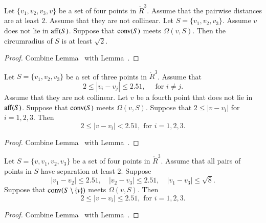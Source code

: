 \newpage
\begin{lemma}
Let $\{v_1,v_2,v_3,v\}$ be a set of four points in $\ring{R}^3$. Assume that the pairwise
distances are at least $2$.
Assume that they are not collinear.
Let $S=\{v_1,v_2,v_3\}$.
Assume $v$ does not lie in ${\operatorname{aff}}(S)$.  Suppose that
${\operatorname{conv}}(S)$ meets $\Omega(v,S)$.  Then the circumradius
of $S$ is at least $\sqrt2$.
\end{lemma}

\begin{proof} Combine Lemma~ with
Lemma~.
\end{proof}

\begin{lemma}
Let $S=\{v_1,v_2,v_3\}$ be a
set of three points in $\ring{R}^3$.  Assume that
  $$
  2\le |v_i-v_j|\le 2.51, \quad\text{ for } i\ne j.
  $$
Assume that they are not collinear. Let $v$ be a fourth
point that does not lie in ${\operatorname{aff}}(S)$.  Suppose that
${\operatorname{conv}}(S)$ meets $\Omega(v,S)$.
Suppose that $2\le |v-v_i|$ for $i=1,2,3$.
Then
  $$
  2 \le |v-v_i | < 2.51, \text{ for } i=1,2,3.
  $$
\end{lemma}

\begin{proof}
Combine Lemma~ with Lemma~.
\end{proof}

\newpage


\begin{lemma}
Let $S=\{v,v_1,v_2,v_3\}$ be a
set of four points in $\ring{R}^3$.
Assume that all pairs of points in $S$ have separation at
least $2$.  Suppose
  $$
  |v_1-v_2|\le 2.51,\quad 
  |v_2-v_3|\le 2.51,\quad
  |v_1-v_3|\le \sqrt{8}.
  $$
Suppose that
${\operatorname{conv}}(S\setminus \{v\})$ meets $\Omega(v,S)$.
Then
  $$
  2 \le |v-v_i | \le 2.51, \text{ for } i=1,2,3.
  $$
\end{lemma}

\begin{proof}
Combine Lemma~ with Lemma~.
\end{proof}

